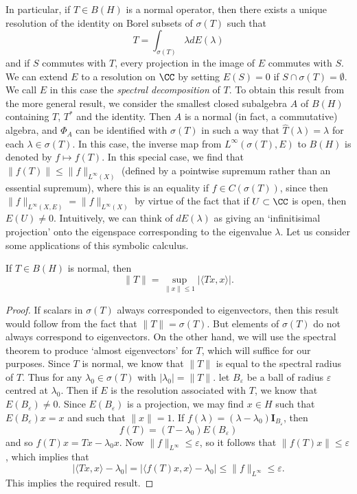 In particular, if $T \in B(H)$ is a normal operator, then there exists a unique resolution of the identity on Borel subsets of $\sigma(T)$ such that
%
\[ T = \int_{\sigma(T)} \lambda dE(\lambda) \]
%
and if $S$ commutes with $T$, every projection in the image of $E$ commutes with $S$. We can extend $E$ to a resolution on $\CC$ by setting $E(S) = 0$ if $S \cap \sigma(T) = \emptyset$. We call $E$ in this case the \emph{spectral decomposition} of $T$. To obtain this result from the more general result, we consider the smallest closed subalgebra $A$ of $B(H)$ containing $T$, $T^*$ and the identity. Then $A$ is a normal (in fact, a commutative) algebra, and $\Phi_A$ can be identified with $\sigma(T)$ in such a way that $\widehat{T}(\lambda) = \lambda$ for each $\lambda \in \sigma(T)$. In this case, the inverse map from $L^\infty(\sigma(T),E)$ to $B(H)$ is denoted by $f \mapsto f(T)$. In this special case, we find that $\| f(T) \| \leq \| f \|_{L^\infty(X)}$ (defined by a pointwise supremum rather than an essential supremum), where this is an equality if $f \in C(\sigma(T))$, since then $\| f \|_{L^\infty(X,E)} = \| f \|_{L^\infty(X)}$ by virtue of the fact that if $U \subset \CC$ is open, then $E(U) \neq 0$. Intuitively, we can think of $dE(\lambda)$ as giving an `infinitisimal projection' onto the eigenspace corresponding to the eigenvalue $\lambda$. Let us consider some applications of this symbolic calculus.

\begin{theorem}
    If $T \in B(H)$ is normal, then
    \[ \| T \| = \sup_{\|x\| \leq 1} |\langle Tx, x \rangle|. \]
\end{theorem}
\begin{proof}
    If scalars in $\sigma(T)$ always corresponded to eigenvectors, then this result would follow from the fact that $\| T \| = \sigma(T)$. But elements of $\sigma(T)$ do not always correspond to eigenvectors. On the other hand, we will use the spectral theorem to produce `almost eigenvectors' for $T$, which will suffice for our purposes. Since $T$ is normal, we know that $\| T \|$ is equal to the spectral radius of $T$. Thus for any $\lambda_0 \in \sigma(T)$ with $|\lambda_0| = \| T \|$. let $B_\varepsilon$ be a ball of radius $\varepsilon$ centred at $\lambda_0$. Then if $E$ is the resolution associated with $T$, we know that $E(B_\varepsilon) \neq 0$. Since $E(B_\varepsilon)$ is a projection, we may find $x \in H$ such that $E(B_\varepsilon) x = x$ and such that $\| x \| = 1$. If $f(\lambda) = (\lambda - \lambda_0) \mathbf{I}_{B_\varepsilon}$, then
    \[ f(T) = (T - \lambda_0) E(B_\varepsilon) \]
    and so $f(T) x = Tx - \lambda_0 x$. Now $\| f \|_{L^\infty} \leq \varepsilon$, so it follows that $\| f(T) x \| \leq \varepsilon$, which implies that
    \[ |\langle Tx, x \rangle - \lambda_0| = |\langle f(T)x, x \rangle - \lambda_0| \leq \| f \|_{L^\infty} \leq \varepsilon. \]
    This implies the required result.
\end{proof}

